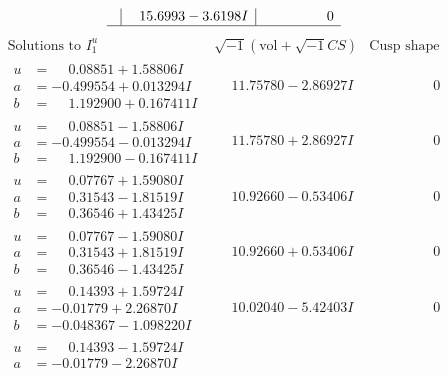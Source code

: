 \documentclass[1p]{elsarticle_modified}
\theoremstyle{definition}
\newcommand{\I}{\sqrt{-1}}
\begin{document}
$$\begin{array}{c|c|c}
 & \phantom{-}15.6993 - 3.6198 I & \phantom{-0.000000 } 0\\
 \hline 
 \end{array}$$\newpage$$\begin{array}{c|c|c}  
\text{Solutions to }I^u_{1}& \I (\text{vol} + \sqrt{-1}CS) & \text{Cusp shape}\\
 \hline 
\begin{aligned}
u &= \phantom{-}0.08851 + 1.58806 I \\
a &= -0.499554 + 0.013294 I \\
b &= \phantom{-}1.192900 + 0.167411 I\end{aligned}
 & \phantom{-}11.75780 - 2.86927 I & \phantom{-0.000000 } 0 \\ \hline\begin{aligned}
u &= \phantom{-}0.08851 - 1.58806 I \\
a &= -0.499554 - 0.013294 I \\
b &= \phantom{-}1.192900 - 0.167411 I\end{aligned}
 & \phantom{-}11.75780 + 2.86927 I & \phantom{-0.000000 } 0 \\ \hline\begin{aligned}
u &= \phantom{-}0.07767 + 1.59080 I \\
a &= \phantom{-}0.31543 - 1.81519 I \\
b &= \phantom{-}0.36546 + 1.43425 I\end{aligned}
 & \phantom{-}10.92660 - 0.53406 I & \phantom{-0.000000 } 0 \\ \hline\begin{aligned}
u &= \phantom{-}0.07767 - 1.59080 I \\
a &= \phantom{-}0.31543 + 1.81519 I \\
b &= \phantom{-}0.36546 - 1.43425 I\end{aligned}
 & \phantom{-}10.92660 + 0.53406 I & \phantom{-0.000000 } 0 \\ \hline\begin{aligned}
u &= \phantom{-}0.14393 + 1.59724 I \\
a &= -0.01779 + 2.26870 I \\
b &= -0.048367 - 1.098220 I\end{aligned}
 & \phantom{-}10.02040 - 5.42403 I & \phantom{-0.000000 } 0 \\ \hline\begin{aligned}
u &= \phantom{-}0.14393 - 1.59724 I \\
a &= -0.01779 - 2.26870 I \\

\end{aligned}
\end{array}$$
\end{document}

